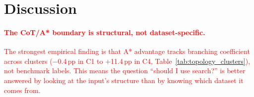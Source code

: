 \documentclass[11pt]{article}
\begin{document}


\section{Discussion}
\label{sec:discussion}


\textcolor{red}{\paragraph{The CoT/A* boundary is structural, not dataset-specific.}
The strongest empirical finding is that A* advantage tracks branching coefficient across clusters ($-$0.4\,pp in C1 to +11.4\,pp in C4, Table~\ref{tab:topology_clusters}), not benchmark labels. This means the question ``should I use search?'' is better answered by looking at the input's structure than by knowing which dataset it comes from.}
\end{document}
